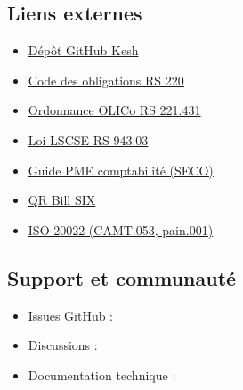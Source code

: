 \documentclass[a4paper,11pt,oneside]{article}
\begin{document}
\subsection{Liens externes}

\begin{itemize}
    \item \href{\keshWebsite}{Dépôt GitHub Kesh}
    \item \href{https://www.fedlex.admin.ch/eli/cc/27/317_321_377/fr}{Code des obligations RS 220}
    \item \href{https://www.fedlex.admin.ch/eli/cc/2002/216/fr}{Ordonnance OLICo RS 221.431}
    \item \href{https://www.fedlex.admin.ch/eli/cc/2016/752/fr}{Loi LSCSE RS 943.03}
    \item \href{https://www.kmu.admin.ch/kmu/fr/home/savoir-pratique/finances/comptabilite-et-revision.html}{Guide PME comptabilité (SECO)}
    \item \href{https://www.six-group.com/en/products-services/banking-services/standardization/qr-bill.html}{QR Bill SIX}
    \item \href{https://www.iso.org/standard/55119.html}{ISO 20022 (CAMT.053, pain.001)}
\end{itemize}

\subsection{Support et communauté}

\begin{itemize}
    \item Issues GitHub : 
    \item Discussions : 
    \item Documentation technique : 
\end{itemize}

\clearpage

\keshversionnote
\end{document}
